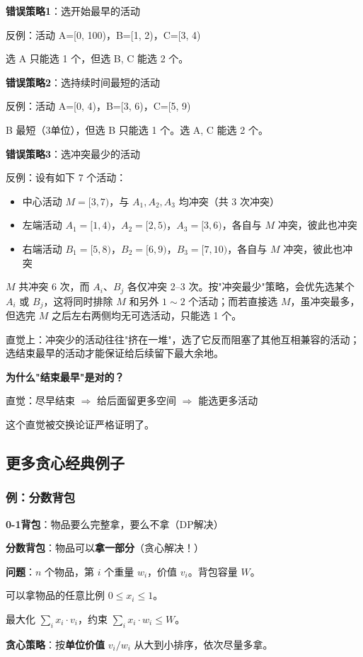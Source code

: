 \documentclass[12pt, a4paper]{ctexart}
\begin{document}
\begin{insight}

\textbf{错误策略1}：选开始最早的活动

反例：活动 A=[0, 100)，B=[1, 2)，C=[3, 4)

选 A 只能选 1 个，但选 B, C 能选 2 个。

\textbf{错误策略2}：选持续时间最短的活动

反例：活动 A=[0, 4)，B=[3, 6)，C=[5, 9)

B 最短（3单位），但选 B 只能选 1 个。选 A, C 能选 2 个。

\textbf{错误策略3}：选冲突最少的活动

反例：设有如下 7 个活动：
\begin{itemize}
    \item 中心活动 $M = [3, 7)$，与 $A_1, A_2, A_3$ 均冲突（共 3 次冲突）
    \item 左端活动 $A_1=[1,4)$，$A_2=[2,5)$，$A_3=[3,6)$，各自与 $M$ 冲突，彼此也冲突
    \item 右端活动 $B_1=[5,8)$，$B_2=[6,9)$，$B_3=[7,10)$，各自与 $M$ 冲突，彼此也冲突
\end{itemize}

$M$ 共冲突 6 次，而 $A_i$、$B_j$ 各仅冲突 2--3 次。按"冲突最少"策略，会优先选某个 $A_i$ 或 $B_j$，这将同时排除 $M$ 和另外 $1\sim2$ 个活动；而若直接选 $M$，虽冲突最多，但选完 $M$ 之后左右两侧均无可选活动，只能选 1 个。

直觉上：冲突少的活动往往"挤在一堆"，选了它反而阻塞了其他互相兼容的活动；选结束最早的活动才能保证给后续留下最大余地。

\textbf{为什么"结束最早"是对的？}

直觉：尽早结束 $\Rightarrow$ 给后面留更多空间 $\Rightarrow$ 能选更多活动

这个直觉被交换论证严格证明了。
\end{insight}

\subsection{更多贪心经典例子}

\subsubsection{例：分数背包}

\begin{blackboard}[分数背包 vs 0-1背包]

\textbf{0-1背包}：物品要么完整拿，要么不拿（DP解决）

\textbf{分数背包}：物品可以\textbf{拿一部分}（贪心解决！）

\textbf{问题}：$n$ 个物品，第 $i$ 个重量 $w_i$，价值 $v_i$。背包容量 $W$。

可以拿物品的任意比例 $0 \leq x_i \leq 1$。

最大化 $\sum_i x_i \cdot v_i$，约束 $\sum_i x_i \cdot w_i \leq W$。

\textbf{贪心策略}：按\textbf{单位价值} $v_i / w_i$ 从大到小排序，依次尽量多拿。

\end{blackboard}
\end{document}
